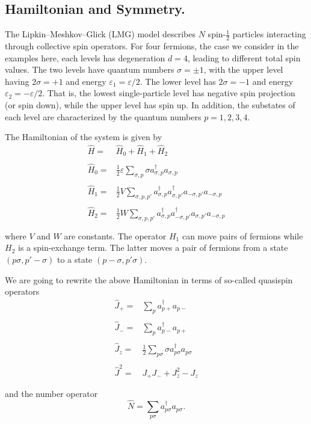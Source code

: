 \documentclass[twocolumn,superscriptaddress,unsortedaddress,nofootinbib,amsmath,amssymb,
aps,floatfix]{revtex4-2}
\begin{document}
\subsection{Hamiltonian and Symmetry.}
The Lipkin--Meshkov--Glick (LMG) model describes $N$ spin-$\tfrac{1}{2}$ particles interacting through collective spin operators.  
For four fermions, the case we consider in the examples  here, each levels has
degeneration $d=4$, leading to different total spin values.  The two
levels have quantum numbers $\sigma=\pm 1$, with the upper level
having $2\sigma=+1$ and energy $\varepsilon_{1}= \varepsilon/2$. The
lower level has $2\sigma=-1$ and energy
$\varepsilon_{2}=-\varepsilon/2$. That is, the lowest single-particle
level has negative spin projection (or spin down), while the upper
level has spin up.  In addition, the substates of each level are
characterized by the quantum numbers $p=1,2,3,4$.



The Hamiltonian of the system is given by
\[
\begin{array}{ll}
\hat{H}=&\hat{H}_{0}+\hat{H}_{1}+\hat{H}_{2}\\
&\\
\hat{H}_{0}=&\frac{1}{2}\varepsilon\sum_{\sigma ,p}\sigma
a_{\sigma,p}^{\dagger}a_{\sigma ,p}\\
&\\
\hat{H}_{1}=&\frac{1}{2}V\sum_{\sigma ,p,p'}
a_{\sigma,p}^{\dagger}a_{\sigma ,p'}^{\dagger}
a_{-\sigma ,p'}a_{-\sigma ,p}\\
&\\
\hat{H}_{2}=&\frac{1}{2}W\sum_{\sigma ,p,p'}
a_{\sigma,p}^{\dagger}a_{-\sigma ,p'}^{\dagger}
a_{\sigma ,p'}a_{-\sigma ,p}\\
&\\
\end{array}
\]
where $V$ and $W$ are constants. The operator 
$H_{1}$ can move pairs of fermions
while $H_{2}$ is a spin-exchange term. The latter
moves a pair of fermions from a state $(p\sigma ,p' -\sigma)$ to a state
$(p-\sigma ,p'\sigma)$.

We are going to rewrite the above Hamiltonian in terms of so-called  quasispin operators
\[
\begin{array}{ll}
\hat{J}_{+}=&\sum_{p}
a_{p+}^{\dagger}a_{p-}\\
&\\
\hat{J}_{-}=&\sum_{p}
a_{p-}^{\dagger}a_{p+}\\
&\\
\hat{J}_{z}=&\frac{1}{2}\sum_{p\sigma}\sigma
a_{p\sigma}^{\dagger}a_{p\sigma}\\
&\\
\hat{J}^{2}=&J_{+}J_{-}+J_{z}^{2}-J_{z}\\
&\\
\end{array}
\]
and the number operator 
\[
\hat{N}=\sum_{p\sigma}
a_{p\sigma}^{\dagger}a_{p\sigma}.
\]
\end{document}
